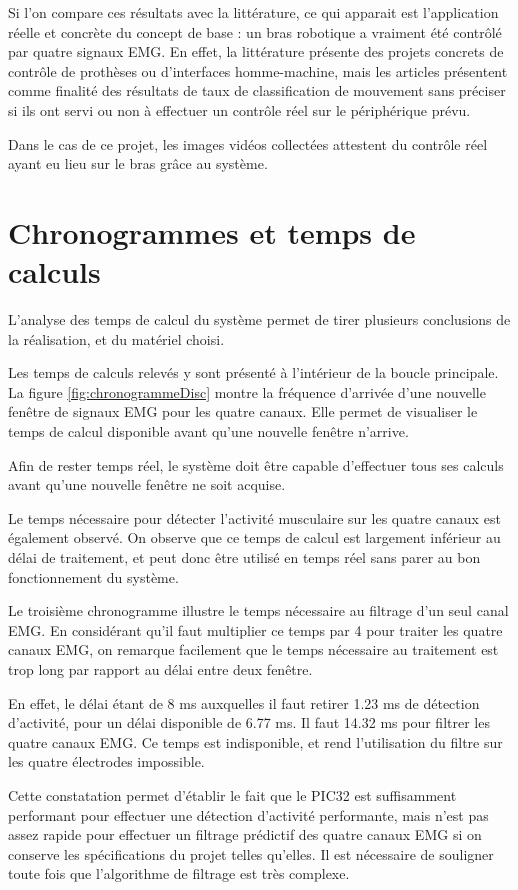 \documentclass[letterpaper, twoside, 12pt, memoire, creativecommons, hyperref]{thETS}
\begin{document}
Si l'on compare ces résultats avec la littérature, ce qui apparait est l'application réelle et concrète du concept de base : un bras robotique a vraiment été contrôlé par quatre signaux EMG. En effet, la littérature présente des projets concrets de contrôle de prothèses ou d'interfaces homme-machine, mais les articles présentent comme finalité des résultats de taux de classification de mouvement sans préciser si ils ont servi ou non à effectuer un contrôle réel sur le périphérique prévu.

Dans le cas de ce projet, les images vidéos collectées attestent du contrôle réel ayant eu lieu sur le bras grâce au système.

\section{Chronogrammes et temps de calculs}

L'analyse des temps de calcul du système permet de tirer plusieurs conclusions de la réalisation, et du matériel choisi. 

Les temps de calculs relevés y sont présenté à l'intérieur de la boucle principale. La figure \ref{fig:chronogrammeDisc} montre la fréquence d'arrivée d'une nouvelle fenêtre de signaux EMG pour les quatre canaux. Elle permet de visualiser le temps de calcul disponible avant qu'une nouvelle fenêtre n'arrive. 

Afin de rester temps réel, le système doit être capable d'effectuer tous ses calculs avant qu'une nouvelle fenêtre ne soit acquise. 

Le temps nécessaire pour détecter l'activité musculaire sur les quatre canaux est également observé. On observe que ce temps de calcul est largement inférieur au délai de traitement, et peut donc être utilisé en temps réel sans parer au bon fonctionnement du système.

Le troisième chronogramme illustre le temps nécessaire au filtrage d'un seul canal EMG. En considérant qu'il faut multiplier ce temps par 4 pour traiter les quatre canaux EMG, on remarque facilement que le temps nécessaire au traitement est trop long par rapport au délai entre deux fenêtre. 

En effet, le délai étant de 8 ms auxquelles il faut retirer 1.23 ms de détection d'activité, pour un délai disponible de 6.77 ms. Il faut 14.32 ms pour filtrer les quatre canaux EMG. Ce temps est indisponible, et rend l'utilisation du filtre sur les quatre électrodes impossible.

Cette constatation permet d'établir le fait que le PIC32 est suffisamment performant pour effectuer une détection d'activité performante, mais n'est pas assez rapide pour effectuer un filtrage prédictif des quatre canaux EMG si on conserve les spécifications du projet telles qu'elles. Il est nécessaire de souligner toute fois que l'algorithme de filtrage est très complexe. 
\end{document}
